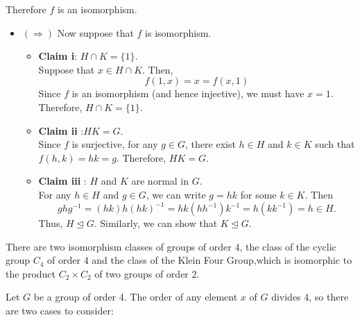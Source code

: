 \documentclass[
]{book}
\begin{document}
Therefore \(f\) is an isomorphism.

\begin{itemize}
\item
  \((\Longrightarrow)\) Now suppose that \(f\) is isomorphism.

  \begin{itemize}
  \item
    \textbf{Claim i}: \(H \cap K = \{1\}\).\\
    Suppose that \(x\in H \cap K\). Then, \[f(1,x)=x=f(x,1)\] Since
    \(f\) is an isomorphism (and hence injective), we must have
    \(x = 1\). Therefore, \(H \cap K = \{1\}\).
  \item
    \textbf{Claim ii} :\(HK = G\).\\
    Since \(f\) is surjective, for any \(g \in G\), there exist
    \(h \in H\) and \(k \in K\) such that \(f(h, k) = hk = g\).
    Therefore, \(HK = G\).
  \item
    \textbf{Claim iii} : \(H\) and \(K\) are normal in \(G\).\\
    For any \(h \in H\) and \(g \in G\), we can write \(g = hk\) for
    some \(k \in K\). Then \[ghg^{-1} = (hk)h(hk)^{-1}
    =hk(hh^{-1})k^{-1}=h(kk^{-1})=h\in H.\] Thus,
    \(H\trianglelefteq G\). Similarly, we can show that
    \(K\trianglelefteq G\).
  \end{itemize}
\end{itemize}

\hfill\break

\leavevmode{}%
There are two isomorphism classes of groups of order \(4\), the class of
the cyclic group \(C_4\) of order \(4\) and the class of the Klein Four
Group,which is isomorphic to the product \(C_2 \times C_2\) of two
groups of order \(2\).

Let \(G\) be a group of order 4. The order of any element \(x\) of \(G\)
divides 4, so there are two cases to consider:
\end{document}
